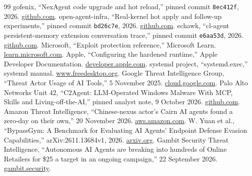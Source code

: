 \documentclass[11pt,letterpaper]{article}
\begin{document}
\begin{thebibliography}{99}
 gofenix, ``NexAgent code upgrade and hot reload,'' pinned commit \texttt{8ec412f}, 2026. \href{https://github.com/gofenix/nex-agent/tree/8ec412fefac75dee3d739cb2e7f9beb911eaeb18}{github.com}.
 open-agent-infra, ``Real-kernel hot apply and follow-up experiments,'' pinned commit \texttt{bd26c7e}, 2026. \href{https://github.com/open-agent-infra/RSInfer/blob/bd26c7e1554211a578e733f7e2fc59feb3a21452/doc/rsi/2026-11-11-real-kernels-hot-apply.md}{github.com}.
 echawk, ``cl-agent persistent-memory extension conversation trace,'' pinned commit \texttt{e6aa53d}, 2026. \href{https://github.com/echawk/cl-agent/blob/e6aa53d2b868c9e3fe7b2bfe88bcae3fe0c997be/successful-runs/memory-proposal-chat.txt}{github.com}.
 Microsoft, ``Exploit protection reference,'' Microsoft Learn. \href{https://learn.microsoft.com/en-us/defender-endpoint/exploit-protection-reference}{learn.microsoft.com}.
 Apple, ``Configuring the hardened runtime,'' Apple Developer Documentation. \href{https://developer.apple.com/documentation/xcode/configuring-the-hardened-runtime.md}{developer.apple.com}.
 systemd project, ``systemd.exec,'' systemd manual. \href{https://www.freedesktop.org/software/systemd/man/latest/systemd.exec.html}{www.freedesktop.org}.
 Google Threat Intelligence Group, ``Threat Actor Usage of AI Tools,'' 5 November 2025. \href{https://cloud.google.com/blog/topics/threat-intelligence/threat-actor-usage-of-ai-tools}{cloud.google.com}.
 Palo Alto Networks Unit 42, ``C2Agent: LLM-Operated Windows Malware With MCP, Skills and Living-off-the-AI,'' pinned analyst note, 9 October 2026. \href{https://github.com/PaloAltoNetworks/Unit42-timely-threat-intel/blob/d74de078d0cf3227a97076dbc7b7fc504c49fe7e/2026-10-09-C2Agent-malware.txt}{github.com}.
 Amazon Threat Intelligence, ``Chinese-nexus actor's Cairn AI agents found a zero-day on their own,'' 20 November 2026. \href{https://aws.amazon.com/blogs/security/chinese-nexus-actors-cairn-ai-agents-found-a-zero-day-on-their-own/}{aws.amazon.com}.
 W. Yuan et al., ``BypassGym: A Benchmark for Evaluating AI Agents' Endpoint Defense Evasion Capabilities,'' arXiv:2611.13684v1, 2026. \href{https://arxiv.org/html/2611.13684}{arxiv.org}.
 Gambit Security Threat Intelligence, ``Autonomous AI Agents are breaking into hundreds of Online Retailers for \$25 a target in an ongoing campaign,'' 22 September 2026. \href{https://gambit.security/blog-posts/autonomous-ai-agents-online-retailers-25-a-company}{gambit.security}.

\end{thebibliography}
\end{document}
